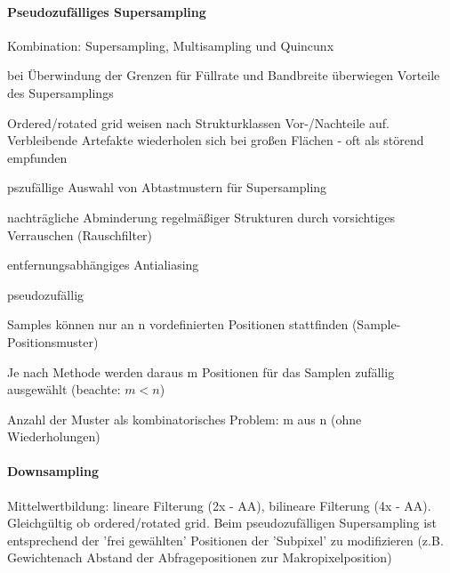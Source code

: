 \documentclass[landscape]{article}
\begin{document}
\begin{multicols}{3}
  \paragraph{Pseudozufälliges Supersampling}
  \begin{itemize*}
    \item Kombination: Supersampling, Multisampling und Quincunx
    \item bei Überwindung der Grenzen für Füllrate und Bandbreite überwiegen Vorteile des Supersamplings
    \item Ordered/rotated grid weisen nach Strukturklassen Vor-/Nachteile auf. Verbleibende Artefakte wiederholen sich bei großen Flächen - oft als störend empfunden
    \item pszufällige Auswahl von Abtastmustern für Supersampling
    \item nachträgliche Abminderung regelmäßiger Strukturen durch vorsichtiges Verrauschen (Rauschfilter)
    \item entfernungsabhängiges Antialiasing
    \item pseudozufällig
    \begin{itemize*}
      \item Samples können nur an n vordefinierten Positionen stattfinden (Sample-Positionsmuster)
      \item Je nach Methode werden daraus m Positionen für das Samplen zufällig ausgewählt (beachte: $m < n$)
      \item Anzahl der Muster als kombinatorisches Problem: m aus n (ohne Wiederholungen)
    \end{itemize*}
  \end{itemize*}
  
  \paragraph{Downsampling}
  Mittelwertbildung: lineare Filterung (2x - AA), bilineare Filterung (4x - AA). Gleichgültig ob ordered/rotated grid. 
  Beim pseudozufälligen Supersampling ist entsprechend der 'frei gewählten' Positionen der 'Subpixel' zu modifizieren (z.B. Gewichtenach Abstand der Abfragepositionen zur Makropixelposition)
  

\end{multicols}
\end{document}

